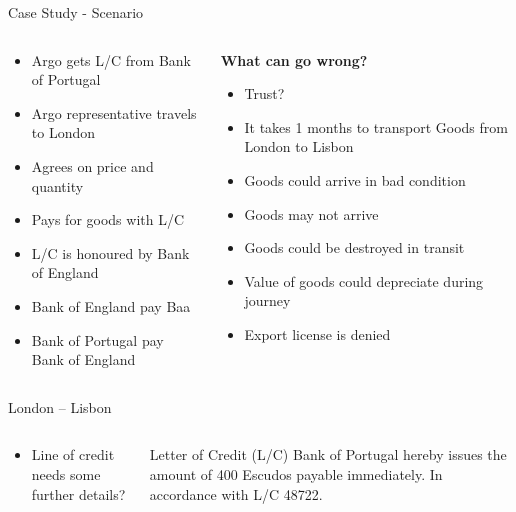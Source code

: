 \documentclass[pdf,table]{beamer}
\begin{document}
\begin{frame}{Case Study - Scenario}
	\begin{columns}[T]
		\begin{column}{0.48\textwidth}
			\begin{itemize}
				\item Argo gets L/C from Bank of Portugal 
				\item Argo representative travels to London 
				\item Agrees on price and quantity
				\item Pays for goods with L/C
				\item L/C is honoured by Bank of England
				\item Bank of England pay Baa
				\item Bank of Portugal pay Bank of England
			\end{itemize}
		\end{column}
		\begin{column}{0.48\textwidth}
			{\bf What can go wrong?}
			\begin{itemize}
				\item Trust?
				\item It takes 1 months to transport Goods from London to Lisbon 
				\item Goods could arrive in bad condition
				\item Goods may not arrive
				\item Goods could be destroyed in transit
				\item Value of goods could depreciate during journey
				\item Export license is denied
			\end{itemize}
		\end{column}
	\end{columns}	
\end{frame}

\begin{frame}{London \--- Lisbon}
	\begin{columns}[T]
		\begin{column}{0.48\textwidth}
			\begin{itemize}
				\item Line of credit needs some further details?
			\end{itemize}
		\end{column}
		\begin{column}{0.48\textwidth}
			\begin{block}{Letter of Credit (L/C)}
				Bank of Portugal hereby issues the amount of 400 Escudos payable immediately. In accordance with L/C 48722.
				
			\end{block}
		\end{column}
	\end{columns}	
\end{frame}
\end{document}
